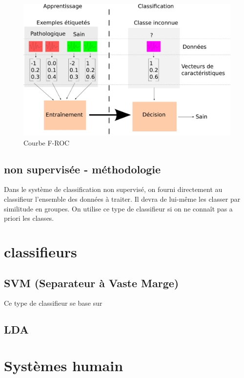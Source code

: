 \begin{figure}[h]
	
	\label{fig:courbeFROC}
	\begin{center}
	\includegraphics[width=15cm]{images/fonctionnementClassif}
	\end{center}
	\caption{Courbe F-ROC}
\end{figure}

		\subsection{non supervisée - méthodologie}

Dans le système de classification non supervisé, on fourni directement au classifieur l'ensemble des données à traiter. Il devra de lui-même les classer par similitude en groupes. On utilise ce type de classifieur si on ne connaît pas a priori les classes.

	\section{classifieurs}

		
		\subsection{SVM (Separateur à Vaste Marge)}

Ce type de classifieur se base sur 
		\subsection{LDA}

	\section{Systèmes humain}
